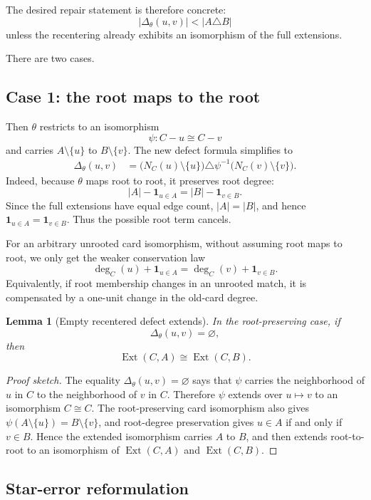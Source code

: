 \documentclass[11pt]{article}
\newtheorem{lemma}{Lemma}
\newcommand{\Ext}{\operatorname{Ext}}
\newcommand{\one}{\mathbf{1}}
\begin{document}
The desired repair statement is therefore concrete:
\[
  |\Delta_{\theta}(u,v)| < |A\triangle B|
\]
unless the recentering already exhibits an isomorphism of the full extensions.

There are two cases.

\subsection{Case 1: the root maps to the root}

Then \(\theta\) restricts to an isomorphism
\[
  \psi : C-u \cong C-v
\]
and carries \(A\setminus\{u\}\) to \(B\setminus\{v\}\).
The new defect formula simplifies to
\[
\begin{aligned}
  \Delta_{\theta}(u,v)
  &=
  \bigl(N_C(u)\setminus\{u\}\bigr)
  \triangle
  \psi^{-1}\bigl(N_C(v)\setminus\{v\}\bigr).
\end{aligned}
\]
Indeed, because \(\theta\) maps root to root, it preserves root degree:
\[
  |A|-\one_{u\in A} = |B|-\one_{v\in B}.
\]
Since the full extensions have equal edge count, \(|A|=|B|\), and hence
\(\one_{u\in A}=\one_{v\in B}\).  Thus the possible root term cancels.

For an arbitrary unrooted card isomorphism, without assuming root maps to root,
we only get the weaker conservation law
\[
  \deg_C(u)+\one_{u\in A}
  =
  \deg_C(v)+\one_{v\in B}.
\]
Equivalently, if root membership changes in an unrooted match, it is
compensated by a one-unit change in the old-card degree.

\begin{lemma}[Empty recentered defect extends]
In the root-preserving case, if
\[
  \Delta_{\theta}(u,v)=\varnothing,
\]
then
\[
  \Ext(C,A)\cong \Ext(C,B).
\]
\end{lemma}

\begin{proof}[Proof sketch]
The equality \(\Delta_{\theta}(u,v)=\varnothing\) says that \(\psi\) carries
the neighborhood of \(u\) in \(C\) to the neighborhood of \(v\) in \(C\).
Therefore \(\psi\) extends over \(u\mapsto v\) to an isomorphism \(C\cong C\).
The root-preserving card isomorphism also gives
\(\psi(A\setminus\{u\})=B\setminus\{v\}\), and root-degree preservation gives
\(u\in A\) if and only if \(v\in B\).  Hence the extended isomorphism carries
\(A\) to \(B\), and then extends root-to-root to an isomorphism of
\(\Ext(C,A)\) and \(\Ext(C,B)\).
\end{proof}

\subsection{Star-error reformulation}
\end{document}
